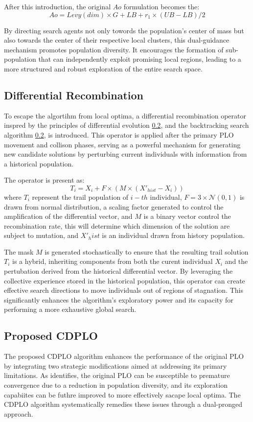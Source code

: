 \documentclass[review]{elsarticle}
\begin{document}
After this introduction, the original $Ao$ formulation becomes the:
\begin{equation}
Ao = Levy(dim) \times G + LB + r_1 \times (UB - LB)/2
\end{equation}

By directing search agents not only towords the population's center of mass but also towards the center of their respective local clusters, this dual-guidance mechanism promotes population diversity. It encourages the formation of sub-population that can independently exploit promising local regions, leading to a more structured and robust exploration of the entire search space.

\subsection{Differential Recombination}
To escape the algortihm from local optima, a differential recombination operator inspred by the principles of differential evolution \ref{}, and the backtracking search algorithm \ref{},  is introduced. This operator is applied after the primary PLO movement and collison phases, serving as a powerful mechanism for generating new candidate solutions by perturbing current individuals with information from a historical population.

The operator is present as:
\begin{equation}
T_i = X_i + F \times (M \times (X'_{hist} - X_i))
\end{equation}
where $T_i$ represent the trail population of $i-th$ individual, $F = 3 \times \mathcal{N}(0, 1)$ is drawn from normal distribution, a scaling factor generated to control the amplification of the differential vector, and $M$ is a binary vector control the recombination rate, this will determine which dimension of the solution are subject to mutation, and $X'_hist$ is an individual drawn from history population.

The mask $M$ is generated stochastically to ensure that the resulting trail solution $T_i$ is a hybrid, inheriting components from both the curent individual $X_i$ and the pertubation derived from the historical differential vector. By leveraging the collective experience stored in the historical population, this operator can create effective search directions to move individuals out of regions of stagnation. This significantly enhances the algorithm's exploratory power and its capacity for performing a more exhaustive global search.

\subsection{Proposed CDPLO}
The proposed CDPLO algorithm enhances the performance of the original PLO by integrating two strategic modifications aimed at addressing its primary limitations. As identifies, the original PLO can be susceptible to premature convergence due to a reduction in population diversity, and its exploration capabiites can be futhre improved to more effectively sacape local optima. The CDPLO algorithm systematically remedies these issues through a dual-pronged approach.
\end{document}
